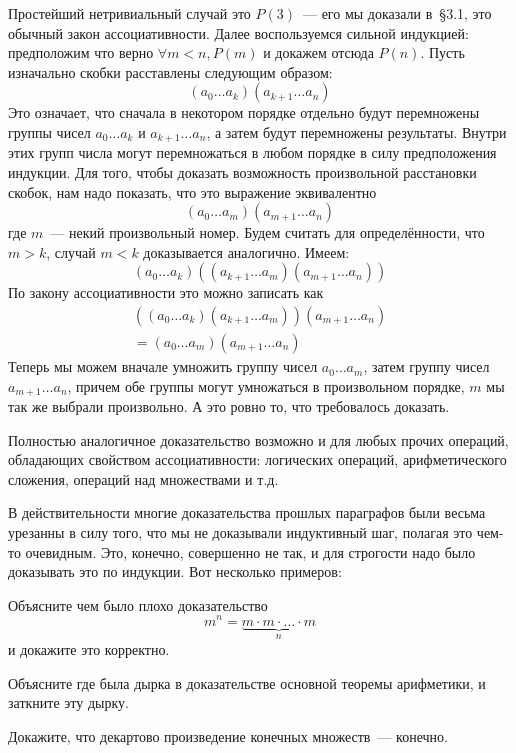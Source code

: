 Простейший нетривиальный случай это $P(3)$~--- его мы доказали в~\S3.1, это обычный закон ассоциативности. Далее воспользуемся сильной индукцией: предположим что верно $\forall m<n, P(m)$ и докажем отсюда $P(n)$. Пусть изначально скобки расставлены следующим образом:
$$(a_0\ldots a_k)(a_{k+1}\ldots a_n)$$
Это означает, что сначала в некотором порядке отдельно будут перемножены группы чисел $a_0\ldots a_k$ и $a_{k+1}\ldots a_n$, а затем будут перемножены результаты. Внутри этих групп числа могут перемножаться в любом порядке в силу предположения индукции. Для того, чтобы доказать возможность произвольной расстановки скобок, нам надо показать, что это выражение эквивалентно
$$(a_0\ldots a_m)(a_{m+1}\ldots a_n)$$
где $m$~--- некий произвольный номер. Будем считать для определённости, что $m>k$, случай $m<k$ доказывается аналогично. Имеем:
$$(a_0\ldots a_k)((a_{k+1}\ldots a_m)(a_{m+1}\ldots a_n))$$
По закону ассоциативности это можно записать как
\begin{align*}
((a_0\ldots a_k)(a_{k+1}\ldots a_m))(a_{m+1}\ldots a_n)\\
= (a_0\ldots  a_m)(a_{m+1}\ldots a_n)
\end{align*}
Теперь мы можем вначале умножить группу чисел $a_0\ldots a_m$, затем группу чисел $a_{m+1}\ldots a_n$, причем обе группы могут умножаться в произвольном порядке, $m$ мы так же выбрали произвольно. А это ровно то, что требовалось доказать.

Полностью аналогичное доказательство возможно и для любых прочих операций, обладающих свойством ассоциативности: логических операций, арифметического сложения, операций над множествами и т.д.

В действительности многие доказательства прошлых параграфов были весьма урезанны в силу того, что мы не доказывали индуктивный шаг, полагая это чем-то очевидным. Это, конечно, совершенно не так, и для строгости надо было доказывать это по индукции. Вот несколько примеров:

\begin{exercise}
Объясните чем было плохо доказательство
$$m^n = \underbrace{m\cdot m \cdot \ldots \cdot m}_n$$
и докажите это корректно.
\end{exercise}

\begin{exercise}
Объясните где была дырка в доказательстве основной теоремы арифметики, и заткните эту дырку.
\end{exercise}

\begin{exercise}
Докажите, что декартово произведение конечных множеств~--- конечно.
\end{exercise}

